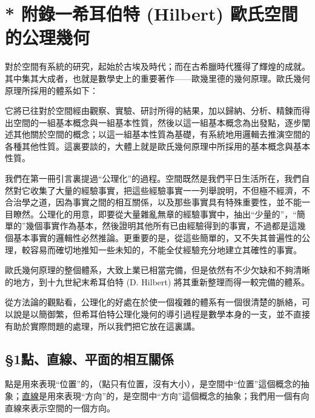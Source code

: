 \section*{* 附錄一\quad 希耳伯特 (Hilbert) 歐氏空間的公理幾何}
\label{sec:b3s_a1}

\renewcommand{\thefigure}{附1-\arabic{figure}}
\setcounter{figure}{0}

對於空間有系統的研究，起始於古埃及時代；而在古希臘時代獲得了輝煌的成就。其中集其大成者，也就是數學史上的重要著作——歐幾里德的幾何原理。歐氏幾何原理所採用的體系如下：

它將已往對於空間經由觀察、實驗、研討所得的結果，加以歸納、分析、精鍊而得出空間的一組基本概念與一組基本性質，然後以這一組基本概念為出發點，逐步闡述其他關於空間的概念；以這一組基本性質為基礎，有系統地用邏輯去推演空間的各種其他性質。這裏要談的，大體上就是歐氏幾何原理中所採用的基本概念與基本性質。

我們在第一冊引言裏提過“公理化”的過程。空間既然是我們平日生活所在，我們自然對它收集了大量的經驗事實，把這些經驗事實一一列舉說明，不但極不經濟，不合治學之道，因為事實之間的相互關係，以及那些事實具有特殊重要性，並不能一目瞭然。公理化的用意，即要從大量雜亂無章的經驗事實中，抽出“少量的”，“簡單的”幾個事實作為基本，然後證明其他所有已由經驗得到的事實，不過都是這幾個基本事實的邏輯性必然推論。更重要的是，從這些簡單的，又不失其普遍性的公理，較容易而確切地推知一些未知的，不能全仗經驗充分地建立其確性的事實。

歐氏幾何原理的整個體系，大致上業已相當完備，但是依然有不少欠缺和不夠清晰的地方，到十九世紀末希耳伯特 (D. Hilbert) 將其重新整理而得一較完備的體系。

從方法論的觀點看，公理化的好處在於使一個複雜的體系有一個很清楚的脈絡，可以說是以簡御繁，但希耳伯特公理化幾何的導引過程是數學本身的一支，並不直接有助於實際問題的處理，所以我們把它放在這裏講。

\subsection*{\S 1\quad 點、直線、平面的相互關係}
\label{sec:b3s_a1_1}

點是用來表現“位置”的，（點只有位置，沒有大小），是空間中“位置”這個概念的抽象；\underline{直線}是用來表現“方向”的，是空間中“方向”這個概念的抽象；我們用一個有向直線來表示空間的一個方向。

